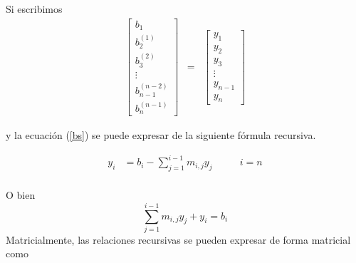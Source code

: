 \documentclass[
]{article}
\begin{document}
Si escribimos \begin{equation*}
\begin{array}{ccc}
   \begin{bmatrix} 
       b_1          \\  
       b_2^{(1)}    \\
       b_3^{(2)}    \\
     \vdots         \\
     b_{n-1}^{(n-2)}\\
     b_{n}^{(n-1)}
  \end{bmatrix}   &= & 
  \begin{bmatrix} 
       y_1        \\  
       y_2        \\
       y_3        \\
     \vdots       \\
     y_{n-1}      \\
     y_{n}
  \end{bmatrix} 
\end{array}
\end{equation*}

y la ecuación (\ref{bs}) se puede expresar de la siguiente fórmula
recursiva.

\begin{equation}\label{bs2}
\begin{array}{ccccc}
y_{i}  & = b_{i}  - \sum_{j=1}^{i-1} m_{i,j}y_j & & \,\,   & i= n \\
\end{array}
\end{equation}

O bien \[
\sum_{j=1}^{i-1} m_{i,j}y_j + y_i = b_i
\] Matricialmente, las relaciones recursivas se pueden expresar de forma
matricial como
\end{document}
